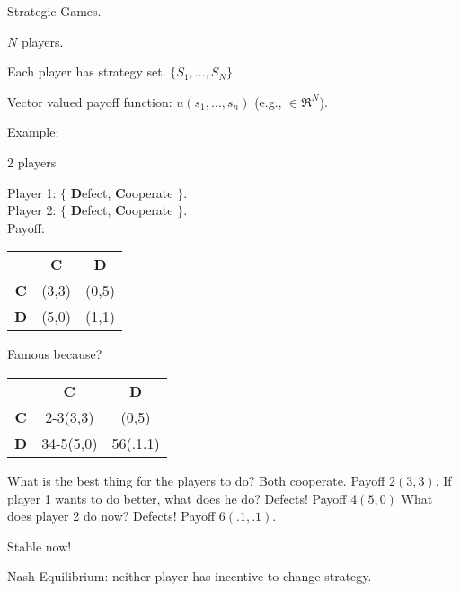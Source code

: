 \begin{frame}{Strategic Games.}

$N$ players. 

Each player has strategy set. $\{S_1,\ldots,S_N\}$.

Vector valued payoff function: $u(s_1,\ldots,s_n)$ (e.g., $\in \Re^N$).


Example:

2 players

Player 1: $\{$ {\bf D}efect, {\bf C}ooperate $\}$. \\
Player 2: $\{$ {\bf D}efect, {\bf C}ooperate $\}$. \\

Payoff:



\begin{tabular}{c| c | c|}
& {\bf C} & {\bf D} \\
{\bf C} & (3,3) & (0,5) \\
{\bf D} & (5,0) & (1,1) \\
\end{tabular}

\end{frame}

\begin{frame}{Famous because?}

\begin{tabular}{c| c | c|}
& {\bf C} & {\bf D} \\
{\bf C} & {2-3}{(3,3)} & (0,5) \\
{\bf D} & {3}{{4-5}{(5,0)}} & {5}{{6}{(.1.1)}} \\
\end{tabular}

What is the best thing for the players to do?
Both cooperate. Payoff {2}{$(3,3)$.}
If player 1 wants to do better, what does he do?
Defects!   Payoff {4}{$(5,0)$}
What does player 2 do now?
Defects! Payoff {6}{$(.1,.1)$}.

Stable now!

Nash Equilibrium: neither player has incentive to change
strategy. 

\end{frame}

